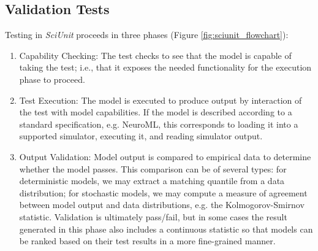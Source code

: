 \documentclass[11pt,letterpaper]{article}
\begin{document}
\subsection{Validation Tests}\label{sec:validation_tests} 
Testing in \textit{SciUnit} proceeds in three phases (Figure \ref{fig:sciunit_flowchart}): 
\begin{enumerate}
\item Capability Checking: The test checks to see that the model is capable of taking the test; i.e., that it exposes the needed functionality for the execution phase to proceed.
\item Test Execution: The model is executed to produce output by interaction of the test with model capabilities.  If the model is described according to a standard specification, e.g. NeuroML, this corresponds to loading it into a supported simulator, executing it, and reading simulator output. 
\item Output Validation: Model output is compared to empirical data to determine whether the model passes.  This comparison can be of several types: for deterministic models, we may extract a matching quantile from a data distribution; for stochastic models, we may compute a measure of agreement between model output and data distributions, e.g. the Kolmogorov-Smirnov statistic.  Validation is ultimately pass/fail, but in some cases the result generated in this phase also includes a continuous statistic so that models can be ranked based on their test results in a more fine-grained manner.   
\end{enumerate}
\end{document}
